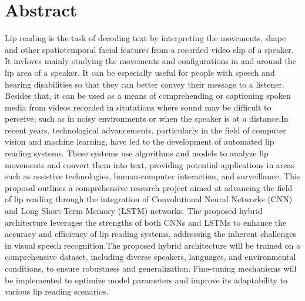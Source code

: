 		\large
			\chapter*{Abstract}
		\normalsize
		
		Lip reading is the task of decoding text by interpreting the movements, shape and other spatiotemporal facial features from  a recorded video clip of a speaker. It invloves mainly studying the movements and configurations in and around the lip area of a speaker. It can be especially useful for people with speech and hearing disabilities so that they can better convey their message to a listener. Besides that, it can be used as a means of comprehending or captioning spoken media from videos recorded in situtations where sound may be difficult to perceive, such as in noisy environments or when the speaker is at a distance.In recent years, technological advancements, particularly in the field of computer vision and machine learning, have led to the development of automated lip reading systems. These systems use algorithms and models to analyze lip movements and convert them into text, providing potential applications in areas such as assistive technologies, human-computer interaction, and surveillance. This proposal outlines a comprehensive research project aimed at advancing the field of lip reading through the integration of Convolutional Neural Networks (CNN) and Long Short-Term Memory (LSTM) networks. The proposed hybrid architecture leverages the strengths of both CNNs and LSTMs to enhance the accuracy and efficiency of lip reading systems, addressing the inherent challenges in visual speech recognition.The proposed hybrid architecture will be trained on a comprehensive dataset, including diverse speakers, languages, and environmental conditions, to ensure robustness and generalization. Fine-tuning mechanisms will be implemented to optimize model parameters and improve its adaptability to various lip reading scenarios.
		
		\break
		
		
	\tableofcontents
		

	\break
	
	\listoffigures
		
	\break
	\pagebreak
	
	
		\Large
			\begingroup
				\let\clearpage\relax
